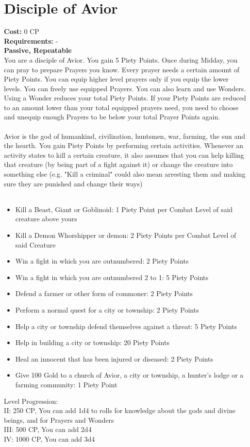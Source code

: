 \section{Disciple of Avior}
\textbf{Cost:} 0 CP\\
\textbf{Requirements:} - \\
\textbf{Passive, Repeatable}\\
You are a disciple of Avior. You gain 5 Piety Points. Once during Midday, you can pray to prepare Prayers you know. Every prayer needs a certain amount of Piety Points. You can equip higher level prayers only if you equip the lower levels. You can freely use equipped Prayers. You can also learn and use Wonders. Using a Wonder reduces your total Piety Points. If your Piety Points are reduced to an amount lower than your total equipped prayers need, you need to choose and unequip enough Prayers to be below your total Prayer Points again.\\
\\
Avior is the god of humankind, civilization, huntsmen, war, farming, the sun and the hearth. You gain Piety Points by performing certain activities. Whenever an activity states to kill a certain creature, it also assumes that you can help killing that creature (by being part of a fight against it) or change the creature into something else (e.g. "Kill a criminal" could also mean arresting them and making sure they are punished and change their ways)\\
\\
\begin{itemize}
	\item Kill a Beast, Giant or Goblinoid: 1 Piety Point per Combat Level of said creature above yours
	\item Kill a Demon Whorshipper or demon: 2 Piety Points per Combat Level of said Creature
	\item Win a fight in which you are outnumbered: 2 Piety Points
	\item Win a fight in which you are outnumbered 2 to 1: 5 Piety Points
	\item Defend a farmer or other form of commoner: 2 Piety Points
	\item Perform a normal quest for a city or township: 2 Piety Points
	\item Help a city or township defend themselves against a threat: 5 Piety Points
	\item Help in building a city or township: 20 Piety Points
	\item Heal an innocent that has been injured or diseased: 2 Piety Points
	\item Give 100 Gold to a church of Avior, a city or township, a hunter's lodge or a farming community: 1 Piety Point
\end{itemize}

Level Progression:\\
II: 250 CP, You can add 1d4 to rolls for knowledge about the gods and divine beings, and for Prayers and Wonders\\
III: 500 CP, You can add 2d4\\
IV: 1000 CP, You can add 3d4\\